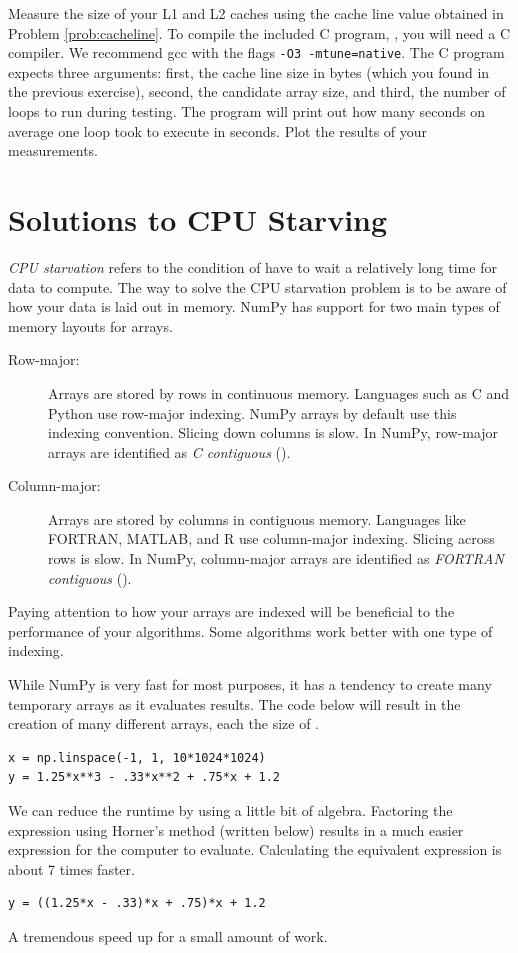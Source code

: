 \begin{problem}
Measure the size of your L1 and L2 caches using the cache line value obtained in
Problem \ref{prob:cacheline}.
To compile the included C program, , you will need a C compiler.
We recommend gcc with the flags \texttt{-O3 -mtune=native}.
The C program expects three arguments: first, the cache line size in bytes (which you found in the previous exercise), second, the candidate array size, and third, the number of loops to run during testing.
The program will print out how many seconds on average one loop took to execute in seconds.
Plot the results of your measurements.
\end{problem}

\section*{Solutions to CPU Starving}
\emph{CPU starvation} refers to the condition of have to wait a relatively long time for data to compute.
The way to solve the CPU starvation problem is to be aware of how your data is laid out in memory.
NumPy has support for two main types of memory layouts for arrays.
\begin{description}
\item[Row-major:] Arrays are stored by rows in continuous memory.
Languages such as C and Python use row-major indexing.  NumPy arrays by default use this indexing convention.
Slicing down columns is slow.  In NumPy, row-major arrays are identified as \emph{C contiguous} ().
\item[Column-major:] Arrays are stored by columns in contiguous memory.
Languages like FORTRAN, MATLAB, and R use column-major indexing.  Slicing across rows is slow.
In NumPy, column-major arrays are identified as \emph{FORTRAN contiguous} ().
\end{description}
Paying attention to how your arrays are indexed will be beneficial to the performance of your algorithms.
Some algorithms work better with one type of indexing.

While NumPy is very fast for most purposes, it has a tendency to create many temporary arrays as it evaluates results.
The code below will result in the creation of many different arrays, each the size of .

\begin{lstlisting}
x = np.linspace(-1, 1, 10*1024*1024)
y = 1.25*x**3 - .33*x**2 + .75*x + 1.2
\end{lstlisting}
We can reduce the runtime by using a little bit of algebra.
Factoring the expression using Horner's method (written below) results in a much easier expression for the computer to evaluate.
Calculating the equivalent expression is about 7 times faster.
\begin{lstlisting}
y = ((1.25*x - .33)*x + .75)*x + 1.2
\end{lstlisting}
A tremendous speed up for a small amount of work.

